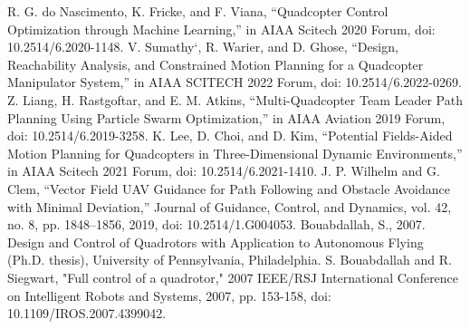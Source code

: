\documentclass[conference]{IEEEtran}
\begin{document}
\begin{thebibliography}{00}
 R. G. do Nascimento, K. Fricke, and F. Viana, “Quadcopter Control Optimization through Machine Learning,” in AIAA Scitech 2020 Forum, doi: 10.2514/6.2020-1148.
 V. Sumathy`, R. Warier, and D. Ghose, “Design, Reachability Analysis, and Constrained Motion Planning for a Quadcopter Manipulator System,” in AIAA SCITECH 2022 Forum, doi: 10.2514/6.2022-0269.
 Z. Liang, H. Rastgoftar, and E. M. Atkins, “Multi-Quadcopter Team Leader Path Planning Using Particle Swarm Optimization,” in AIAA Aviation 2019 Forum, doi: 10.2514/6.2019-3258.
 K. Lee, D. Choi, and D. Kim, “Potential Fields-Aided Motion Planning for Quadcopters in Three-Dimensional Dynamic Environments,” in AIAA Scitech 2021 Forum, doi: 10.2514/6.2021-1410.
 J. P. Wilhelm and G. Clem, “Vector Field UAV Guidance for Path Following and Obstacle Avoidance with Minimal Deviation,” Journal of Guidance, Control, and Dynamics, vol. 42, no. 8, pp. 1848–1856, 2019, doi: 10.2514/1.G004053.
 Bouabdallah, S., 2007. Design and Control of Quadrotors with Application to
Autonomous Flying (Ph.D. thesis), University of Pennsylvania, Philadelphia.
 S. Bouabdallah and R. Siegwart, "Full control of a quadrotor," 2007 IEEE/RSJ International Conference on Intelligent Robots and Systems, 2007, pp. 153-158, doi: 10.1109/IROS.2007.4399042.


\end{thebibliography}
\vspace{12pt}
\end{document}
